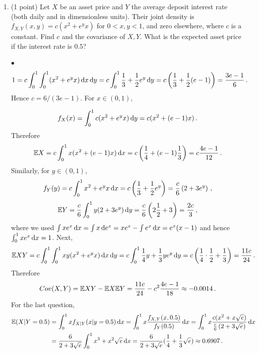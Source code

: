 \documentclass[a4paper]{report}
\begin{document}
\begin{problem}
\begin{enumerate}
\begin{center}
\end{center}
Therefore
\begin{align*}
    &\E X = 34/221 = 2/13;    &D X = \E X^2 - (\E X)^2 = 36/221 - (2/13)^2 =
    400/2873;\\
    &\E Y = 17/34 = 1/2;    &D Y =  \E Y^2 - (\E Y)^2 = 21/34 - 1/4 = 25/68;\\
    &\E XY = 12/221 + 4/221 + 2/442 = 1/13;
    &Cor(X,Y) = \frac{\E XY - \E X \E Y}{\sqrt{D X \cdot D Y}} =
    \frac{1/13 - 1/13 }{\sqrt{D X \cdot D Y}} = 0
    \, .
\end{align*}
Thus $X,Y$ are uncorrelated, although they are not independent!



\item (1 point)
Let $X$ be an asset price and $Y$ the average deposit interest rate (both daily and in dimensionless units). Their joint density is
$f_{X,Y}(x,y)=c(x^2+e^yx)$ for $0<x,y<1$, and zero elsewhere, where $c$ is
a constant. Find
$c$ and the covariance of $X,Y$. What is the expected asset price if
the interest rate
is $0.5$?

$\bullet$
\[
1 = c \int_0^1 \int_0^1 (x^2 + e^y x) \, \mathrm{d} x \, \mathrm{d} y = c \int_0^1 \frac13 + \frac12 e^y \, \mathrm{d} y
= c\left(\frac13 + \frac12 ( e - 1)\right) = \frac{3e - 1}{6} \, .
\]
Hence $c=6/(3e-1)$. For $x\in(0,1)$,

\begin{align*}
f_X(x) = \int_0^1 c(x^2 + e^yx) \, \mathrm{d} y = c(x^2 + (e - 1)x) \, .
\end{align*}
Therefore
\[ \mathbb {E} X = c\int_0^1 x ( x^2 + (e-1)x) \, \mathrm{d} x = c\left(\frac14 + (e-1)\frac13\right)
= c\frac{4e - 1}{12}\, .\]
Similarly, for $y\in(0,1)$,
\[
f_Y(y) = c\int_0^1 x^2 + e^y x \, \mathrm{d} x = c\left(\frac13 + \frac12 e^y\right)
= \frac{c}{6}\left(2 + 3 e^y\right)\, ,
\]
\[
\mathbb {E} Y = \frac{c}{6}\int_0^1 y (2 + 3 e^y) \, \mathrm{d} y  =
\frac{c}{6}\left(
2 \frac12 + 3 \right) = \frac{2c}{3} \, ,
\]
where we used
$\int xe^x\, \mathrm{d} x=\int x\, \mathrm{d} e^x=xe^x-\int e^x\, \mathrm{d} x=e^x(x-1)$ and
hence $\int_0^1 xe^x\, \mathrm{d} x=1$.
Next,
\[
\mathbb {E} XY = c \int_0^1 \int_0^1 xy(x^2 + e^y x) \, \mathrm{d} x \, \mathrm{d} y
=c \int_0^1 \frac14 y + \frac13 ye^y \, \mathrm{d} y =
c \left( \frac14 \cdot\frac12 + \frac13 \right) = \frac{11c}{24}\, .
\]
Therefore
\[
Cov(X, Y) = \mathbb {E} XY - \mathbb {E} X \mathbb {E} Y = \frac{11c}{24} - c^2 \frac{4e - 1}{18} \approx
-0.0014 \, .
\]
For the last question,
\begin{align*}
\mathbb {E} (X | Y = 0.5) &= \int_0^1 x f_{X|Y}(x | y = 0.5) \, \mathrm{d} x
= \int_0^1 x \frac{f_{X, Y}(x, 0.5)}{f_Y(0.5)} \, \mathrm{d} x
= \int_0 ^1 x \frac{c(x^2 + x \sqrt{e})}{\frac{c}{6}\left(2 + 3 \sqrt{e}\right)}\, \mathrm{d} x \\
&= \frac{6}{2 + 3\sqrt{e}} \int_0^1 x^3 + x^2 \sqrt{e} \, \mathrm{d} x
= \frac{6}{2 + 3\sqrt{e}} (\frac14 + \frac13 \sqrt{e}) \approx 0.6907 \, .
\end{align*}



\end{enumerate}
\end{problem}
\end{document}
